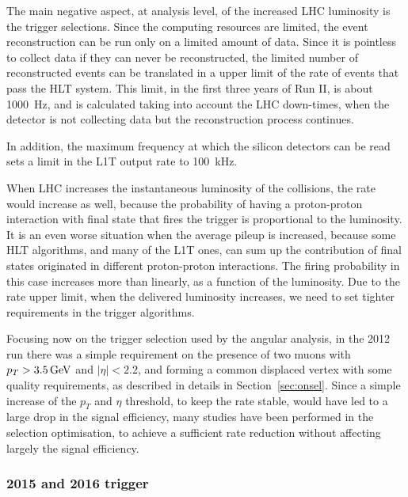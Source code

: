 The main negative aspect, at analysis level, of the increased LHC luminosity is the trigger selections.
Since the computing resources are limited, the event reconstruction can be run only on a limited amount of data.
Since it is pointless to collect data if they can never be reconstructed, the limited number of reconstructed events can be translated in a upper limit of the rate of events that pass the HLT system.
This limit, in the first three years of Run II, is about \SI{1000}{\hertz}, and is calculated taking into account the LHC down-times, when the detector is not collecting data but the reconstruction process continues.

In addition, the maximum frequency at which the silicon detectors can be read sets a limit in the L1T output rate to \SI{100}{\kilo\hertz}.

When LHC increases the instantaneous luminosity of the collisions, the rate would increase as well, because the probability of having a proton-proton interaction with final state that fires the trigger is proportional to the luminosity.
It is an even worse situation when the average pileup is increased, because some HLT algorithms, and many of the L1T ones, can sum up the contribution of final states originated in different proton-proton interactions.
The firing probability in this case increases more than linearly, as a function of the luminosity.
Due to the rate upper limit, when the delivered luminosity increases, we need to set tighter requirements in the trigger algorithms.

Focusing now on the trigger selection used by the \BtoKstmumu angular analysis, in the 2012 run there was a simple requirement on the presence of two muons with $p_T>3.5\,\textrm{GeV}$ and $|\eta|<2.2$, and forming a common displaced vertex with some quality requirements, as described in details in Section~\ref{sec:onsel}.
Since a simple increase of the $p_T$ and $\eta$ threshold, to keep the rate stable, would have led to a large drop in the signal efficiency, many studies have been performed in the selection optimisation, to achieve a sufficient rate reduction without affecting largely the signal efficiency.

\subsubsection{2015 and 2016 trigger}
\label{sec:2016}

